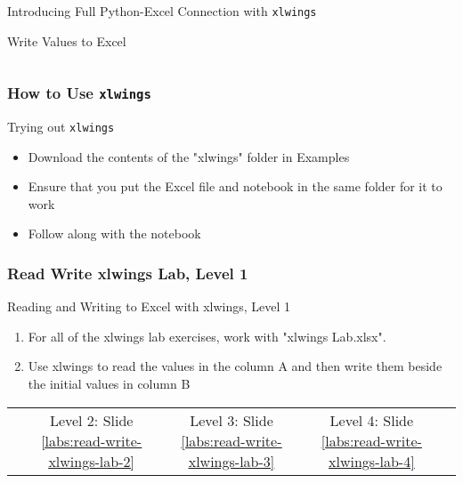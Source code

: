 \documentclass[handout, 11pt]{beamer}
\begin{document}
\begin{section}{Introducing Full Python-Excel Connection with \texttt{xlwings}}
\begin{frame}[fragile]
\begin{block}{Write Values to Excel}
\begin{verbatim}
\end{verbatim}
\end{block}
\end{frame}
\begin{frame}
\frametitle{How to Use \texttt{xlwings}}
{
\begin{block}{Trying out \texttt{xlwings}}
\begin{itemize}
\item Download the contents of the "xlwings" folder in Examples
\item Ensure that you put the Excel file and notebook in the same folder for it to work
\item Follow along with the notebook
\end{itemize}
\end{block}
}
\end{frame}
\begin{frame}
\frametitle{Read Write xlwings Lab, Level 1}
{
\begin{block}{Reading and Writing to Excel with xlwings, Level 1}
\begin{enumerate}
\item For all of the xlwings lab exercises, work with "xlwings Lab.xlsx".
\item Use xlwings to read the values in the column A and then write them beside
the initial values in column B
\end{enumerate}
\vfill
\begin{tabular*}{\textwidth}{@{\extracolsep{\fill}}ccccc}
\toprule
\hfill & Level 2: Slide \textcolor{blue}{\underline{\ref{labs:read-write-xlwings-lab-2}}} & Level 3: Slide \textcolor{blue}{\underline{\ref{labs:read-write-xlwings-lab-3}}} & Level 4: Slide \textcolor{blue}{\underline{\ref{labs:read-write-xlwings-lab-4}}} & \hfill\\

\end{tabular*}
\end{block}
}
\label{labs:read-write-xlwings-lab-1}
\end{frame}
\end{section}
\appendix
{}
\setcounter{finalframe}{\value{framenumber}}
\end{document}
